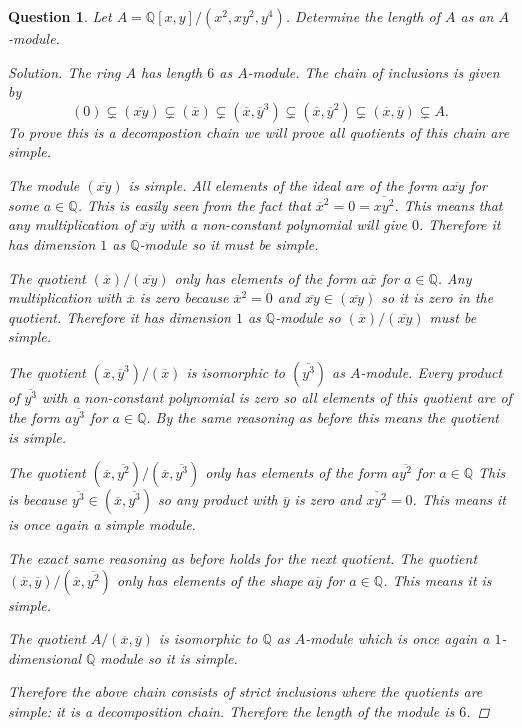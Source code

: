 \documentclass{article}
\newcommand{\Q}{\mathbb{Q}}
\newenvironment{solution}{\begin{proof}[Solution]\renewcommand\qedsymbol{}}{\end{proof}}
\newtheorem{question}{Question}
\theoremstyle{definition}
\begin{document}
\begin{question}
    Let \(A=\Q[x,y]/(x^{2},xy^{2},y^{4})\). Determine the length of \(A\) as an
    \(A\)-module.

    \begin{solution}
        The ring \(A\) has length \(6\) as \(A\)-module. The chain of inclusions
        is given by
        \[
            (0)\subsetneq (\overline{xy})\subsetneq (\overline{x})\subsetneq (\overline{x},\overline{y}^{3})\subsetneq (\overline{x},\overline{y}^{2})\subsetneq (\overline{x},\overline{y})\subsetneq A.
        \]
        To prove this is a decompostion chain we will prove all quotients of
        this chain are simple.

        The module \((\overline{xy})\) is simple. All elements of the ideal are
        of the form \(a\overline{xy}\) for some \(a\in \Q\). This is easily seen
        from the fact that \(\overline{x}^{2}=0=\overline{xy^{2}}\). This means
        that any multiplication of \(\overline{xy}\) with a non-constant
        polynomial will give \(0\). Therefore it has dimension \(1\) as
        \(\Q\)-module so it must be simple.

        The quotient \((\overline{x})/(\overline{xy})\) only has elements of the
        form \(a\overline{x}\) for \(a\in\Q\). Any multiplication with
        \(\overline{x}\) is zero because \(\overline{x}^{2}=0\) and
        \(\overline{xy}\in(\overline{xy})\) so it is zero in the quotient.
        Therefore it has dimension \(1\) as \(\Q\)-module so
        \((\overline{x})/(\overline{xy})\) must be simple.

        The quotient \((\overline{x},\overline{y}^{3})/(\overline{x})\) is
        isomorphic to \((\overline{y^{3}})\) as \(A\)-module. Every product of
        \(\overline{y^{3}}\) with a non-constant polynomial is zero so all
        elements of this quotient are of the form \(a\overline{y^{3}}\) for
        \(a\in\Q\). By the same reasoning as before this means the quotient is
        simple.

        The quotient
        \((\overline{x},\overline{y^{2}})/(\overline{x},\overline{y^{3}})\) only
        has elements of the form \(a\overline{y^{2}}\) for \(a\in\Q\) This is
        because \(\overline{y^{3}}\in(\overline{x},\overline{y^{3}})\) so any
        product with \(\overline{y}\) is zero and \(\overline{xy^{2}}=0\). This
        means it is once again a simple module.

        The exact same reasoning as before holds for the next quotient. The
        quotient \((\overline{x},\overline{y})/(\overline{x},\overline{y^{2}})\)
        only has elements of the shape \(a\overline{y}\) for \(a\in\Q\). This
        means it is simple.

        The quotient \(A/(\overline{x},\overline{y})\) is isomorphic to \(\Q\)
        as \(A\)-module which is once again a \(1\)-dimensional \(\Q\) module
        so it is simple.

        Therefore the above chain consists of strict inclusions where the
        quotients are simple: it is a decomposition chain. Therefore the length
        of the module is \(6\).
    \end{solution}
\end{question}
\end{document}
